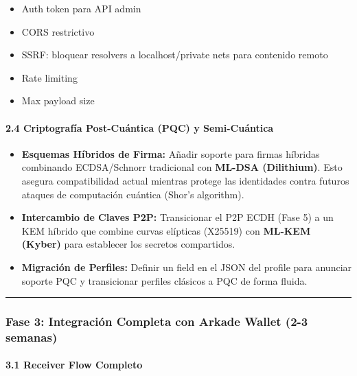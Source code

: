 \documentclass[
]{article}
\providecommand{\tightlist}{%
  \setlength{\itemsep}{0pt}\setlength{\parskip}{0pt}}
\begin{document}
\begin{itemize}
\tightlist
\item[$\square$]
  Auth token para API admin
\item[$\square$]
  CORS restrictivo
\item[$\square$]
  SSRF: bloquear resolvers a localhost/private nets para contenido
  remoto
\item[$\square$]
  Rate limiting
\item[$\square$]
  Max payload size
\end{itemize}

\hypertarget{criptografuxeda-post-cuuxe1ntica-pqc-y-semi-cuuxe1ntica}{%
\paragraph{2.4 Criptografía Post-Cuántica (PQC) y
Semi-Cuántica}\label{criptografuxeda-post-cuuxe1ntica-pqc-y-semi-cuuxe1ntica}}

\begin{itemize}
\tightlist
\item[$\square$]
  \textbf{Esquemas Híbridos de Firma:} Añadir soporte para firmas
  híbridas combinando ECDSA/Schnorr tradicional con \textbf{ML-DSA
  (Dilithium)}. Esto asegura compatibilidad actual mientras protege las
  identidades contra futuros ataques de computación cuántica (Shor's
  algorithm).
\item[$\square$]
  \textbf{Intercambio de Claves P2P:} Transicionar el P2P ECDH (Fase 5)
  a un KEM híbrido que combine curvas elípticas (X25519) con
  \textbf{ML-KEM (Kyber)} para establecer los secretos compartidos.
\item[$\square$]
  \textbf{Migración de Perfiles:} Definir un field en el JSON del
  profile para anunciar soporte PQC y transicionar perfiles clásicos a
  PQC de forma fluida.
\end{itemize}

\begin{center}\rule{0.5\linewidth}{0.5pt}\end{center}

\hypertarget{fase-3-integraciuxf3n-completa-con-arkade-wallet-2-3-semanas}{%
\subsubsection{Fase 3: Integración Completa con Arkade Wallet (2-3
semanas)}\label{fase-3-integraciuxf3n-completa-con-arkade-wallet-2-3-semanas}}

\hypertarget{receiver-flow-completo}{%
\paragraph{3.1 Receiver Flow Completo}\label{receiver-flow-completo}}
\end{document}
